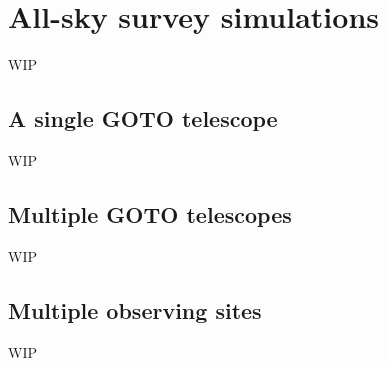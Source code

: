\section{All-sky survey simulations}
\label{sec:allsky_sims}
\begin{colsection}


\begin{colsection}

WIP

\end{colsection}


\subsection{A single GOTO telescope}
\label{sec:allsky_onetel}
\begin{colsection}

WIP

\end{colsection}


\subsection{Multiple GOTO telescopes}
\label{sec:allsky_multitel}
\begin{colsection}

WIP

\end{colsection}


\subsection{Multiple observing sites}
\label{sec:allsky_multisite}
\begin{colsection}

WIP

\end{colsection}


\end{colsection}


\newpage
